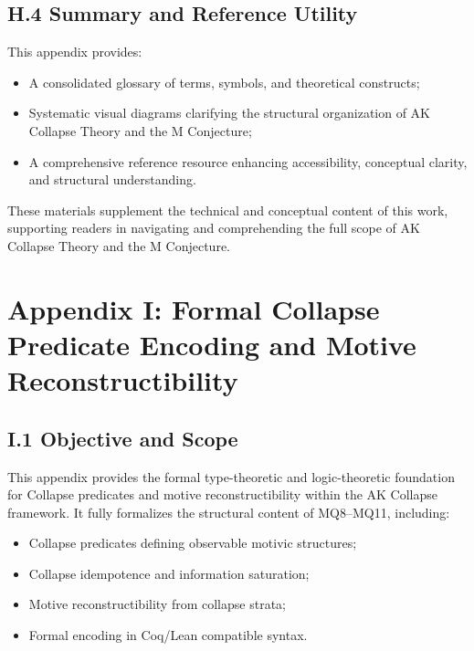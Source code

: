 \documentclass[11pt]{article}
\begin{document}
\subsection*{H.4 Summary and Reference Utility}

This appendix provides:

\begin{itemize}
    \item A consolidated glossary of terms, symbols, and theoretical constructs;
    \item Systematic visual diagrams clarifying the structural organization of AK Collapse Theory and the M Conjecture;
    \item A comprehensive reference resource enhancing accessibility, conceptual clarity, and structural understanding.
\end{itemize}

These materials supplement the technical and conceptual content of this work, supporting readers in navigating and comprehending the full scope of AK Collapse Theory and the M Conjecture.

\FloatBarrier




\section*{Appendix I: Formal Collapse Predicate Encoding and Motive Reconstructibility}

\subsection*{I.1 Objective and Scope}

This appendix provides the formal type-theoretic and logic-theoretic foundation for Collapse predicates and motive reconstructibility within the AK Collapse framework.  
It fully formalizes the structural content of MQ8–MQ11, including:

\begin{itemize}
  \item Collapse predicates defining observable motivic structures;
  \item Collapse idempotence and information saturation;
  \item Motive reconstructibility from collapse strata;
  \item Formal encoding in Coq/Lean compatible syntax.
\end{itemize}
\end{document}
